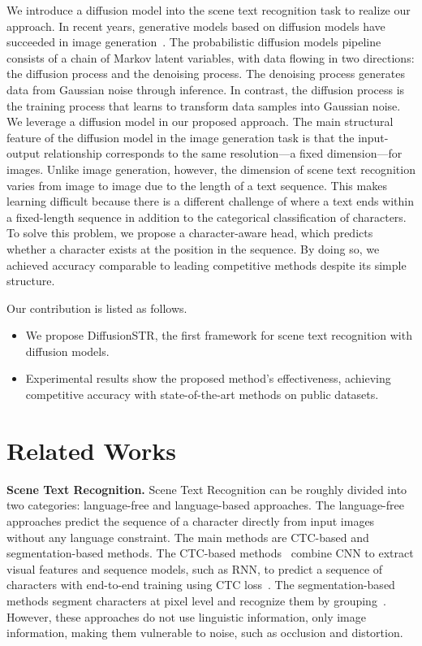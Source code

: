 \documentclass{article}
\begin{document}
We introduce a diffusion model into the scene text recognition task to realize our approach.
In recent years, generative models based on diffusion models have succeeded in image generation~\cite{ho2020ddpm, Hoogeboom2021argmax}.
The probabilistic diffusion models pipeline consists of a chain of Markov latent variables, with data flowing in two directions: the diffusion process and the denoising process. 
The denoising process generates data from Gaussian noise through inference.
In contrast, the diffusion process is the training process that learns to transform data samples into Gaussian noise.
We leverage a diffusion model in our proposed approach.
The main structural feature of the diffusion model in the image generation task is that the input-output relationship corresponds to the same resolution---a fixed dimension---for images.
Unlike image generation, however, the dimension of scene text recognition varies from image to image due to the length of a text sequence.
This makes learning difficult because there is a different challenge of where a text ends within a fixed-length sequence in addition to the categorical classification of characters.
To solve this problem, we propose a character-aware head, which predicts whether a character exists at the position in the sequence.
By doing so, we achieved accuracy comparable to leading competitive methods despite its simple structure.

Our contribution is listed as follows.
\begin{itemize}
    \item We propose DiffusionSTR, the first framework for scene text recognition with diffusion models.
    \item Experimental results show the proposed method's effectiveness, achieving competitive accuracy with state-of-the-art methods on public datasets.
\end{itemize}
 

\section{Related Works} \noindent
\textbf{Scene Text Recognition.}
Scene Text Recognition can be roughly divided into two categories: language-free and language-based approaches.
The language-free approaches predict the sequence of a character directly from input images without any language constraint.
The main methods are CTC-based and segmentation-based methods.
The CTC-based methods~\cite{hu2020gtc, shi2016crnn} combine CNN to extract visual features and sequence models, such as RNN, to predict a sequence of characters with end-to-end training using CTC loss~\cite{graves2006ctcloss}.
The segmentation-based methods segment characters at pixel level and recognize them by grouping~\cite{wan2020textscanner}.
However, these approaches do not use linguistic information, only image information, making them vulnerable to noise, such as occlusion and distortion.
\end{document}
